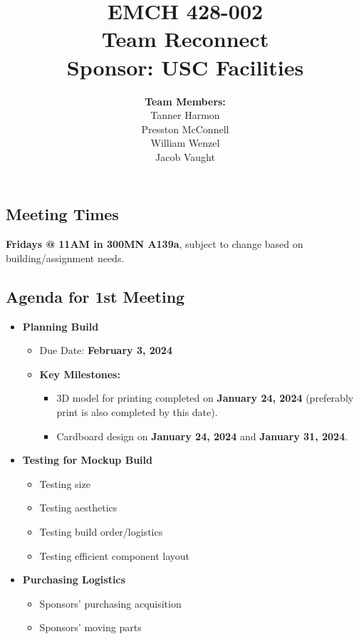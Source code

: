 \documentclass[12pt]{article}
\begin{document}
\title{
    \vspace{2in}
    \textbf{EMCH 428-002} \\[1ex]
    \textbf{Team Reconnect} \\[1ex]
    \textbf{Sponsor: USC Facilities} \\[1ex]
    \vspace{2in}
}

\author{
    \textbf{Team Members:} \\[2ex]
    Tanner Harmon  \\[1ex]
    Presston McConnell \\[1ex]
    William Wenzel  \\[1ex]
    Jacob Vaught
}

\date{}

\maketitle
\thispagestyle{fancy}

\newpage
\subsection*{Meeting Times}
\textbf{Fridays @ 11AM in 300MN A139a}, subject to change based on building/assignment needs.

\subsection*{Agenda for 1st Meeting}
\begin{itemize}[leftmargin=0.3in]
    \item \textbf{Planning Build}
    \begin{itemize}
        \item Due Date: \textbf{February 3, 2024}
        \item \textbf{Key Milestones:}
        \begin{itemize}
            \item 3D model for printing completed on \textbf{January 24, 2024} (preferably print is also completed by this date).
            \item Cardboard design on \textbf{January 24, 2024} and \textbf{January 31, 2024}.
        \end{itemize}
    \end{itemize}
    \item \textbf{Testing for Mockup Build}
    \begin{itemize}
        \item Testing size
        \item Testing aesthetics
        \item Testing build order/logistics
        \item Testing efficient component layout
    \end{itemize}
    \item \textbf{Purchasing Logistics}
    \begin{itemize}
        \item Sponsors' purchasing acquisition
        \item Sponsors' moving parts
    \end{itemize}
\end{itemize}
\end{document}
